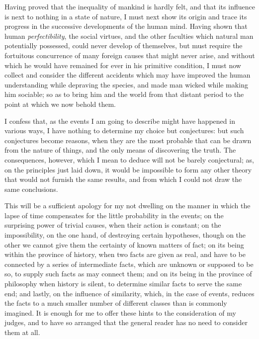 \documentclass[12pt]{report}
\begin{document}
Having proved that the inequality of mankind is hardly felt, and that its influence is next to nothing in a state of nature, I must next show its origin and trace its progress in the successive developments of the human mind. Having shown that human \emph{perfectibility}, the social virtues, and the other faculties which natural man potentially possessed, could never develop of themselves, but must require the fortuitous concurrence of many foreign causes that might never arise, and without which he would have remained for ever in his primitive condition, I must now collect and consider the different accidents which may have improved the human understanding while depraving the species, and made man wicked while making him sociable; so as to bring him and the world from that distant period to the point at which we now behold them.

I confess that, as the events I am going to describe might have happened in various ways, I have nothing to determine my choice but conjectures: but such conjectures become reasons, when they are the most probable that can be drawn from the nature of things, and the only means of discovering the truth. The consequences, however, which I mean to deduce will not be barely conjectural; as, on the principles just laid down, it would be impossible to form any other theory that would not furnish the same results, and from which I could not draw the same conclusions.

This will be a sufficient apology for my not dwelling on the manner in which the lapse of time compensates for the little probability in the events; on the surprising power of trivial causes, when their action is constant; on the impossibility, on the one hand, of destroying certain hypotheses, though on the other we cannot give them the certainty of known matters of fact; on its being within the province of history, when two facts are given as real, and have to be connected by a series of intermediate facts, which are unknown or supposed to be so, to supply such facts as may connect them; and on its being in the province of philosophy when history is silent, to determine similar facts to serve the same end; and lastly, on the influence of similarity, which, in the case of events, reduces the facts to a much smaller number of different classes than is commonly imagined. It is enough for me to offer these hints to the consideration of my judges, and to have so arranged that the general reader has no need to consider them at all.
\end{document}
